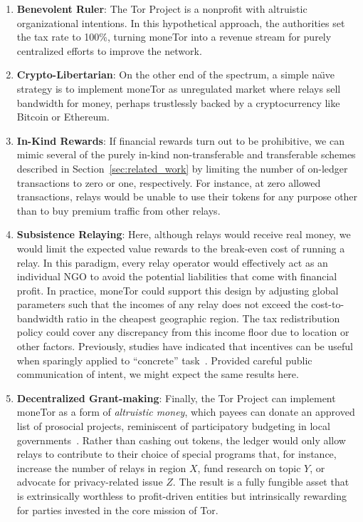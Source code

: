 \begin{enumerate}

\item \textbf{Benevolent Ruler}: The Tor Project is a nonprofit with altruistic organizational intentions.
  In this hypothetical approach, the authorities set the tax rate to 100\%, turning moneTor into a revenue stream for purely centralized efforts to improve the network.

\item \textbf{Crypto-Libertarian}: On the other end of the spectrum, a simple na\"{\i}ve strategy is to implement moneTor as unregulated market where relays sell bandwidth for money, perhaps trustlessly backed by a cryptocurrency like Bitcoin or Ethereum.

\item \textbf{In-Kind Rewards}: If financial rewards turn out to be prohibitive, we can mimic several of the purely in-kind non-transferable and transferable schemes described in Section~\ref{sec:related_work} by limiting the number of on-ledger transactions to zero or one, respectively.
  For instance, at zero allowed transactions, relays would be unable to use their tokens for any purpose other than to buy premium traffic from other relays.

\item \textbf{Subsistence Relaying}: Here, although relays would receive real money, we would limit the expected value rewards to the break-even cost of running a relay.
In this paradigm, every relay operator would effectively act as an individual NGO to avoid the potential liabilities that come with financial profit.
In practice, moneTor could support this design by adjusting global parameters such that the incomes of any relay does not exceed the cost-to-bandwidth ratio in the cheapest geographic region.
The tax redistribution policy could cover any discrepancy from this income floor due to location or other factors.
Previously, studies have indicated that incentives can be useful when sparingly applied to ``concrete'' task~\cite{10.1257/jep.25.4.191, 10.1086/431263}.
Provided careful public communication of intent, we might expect the same results here.

\item \textbf{Decentralized Grant-making}: Finally, the Tor Project can implement moneTor as a form of \emph{altruistic money}, which payees can donate an approved list of prosocial projects, reminiscent of participatory budgeting in local governments~\cite{cabannes2004participatory}.
Rather than cashing out tokens, the ledger would only allow relays to contribute to their choice of special programs that, for instance, increase the number of relays in region $X$, fund research on topic $Y$, or advocate for privacy-related issue $Z$.
The result is a fully fungible asset that is extrinsically worthless to profit-driven entities but intrinsically rewarding for parties invested in the core mission of Tor.

\end{enumerate}

